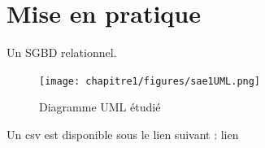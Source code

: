 \documentclass[10pt, a4paper]{article}
\begin{document}
\newpage
\section{Mise en pratique}



\begin{tcolorbox}[lefttitle=1cm, colframe=gray!75!black, colback=white, title=\textbf{ENTREE : un SGBD relationnel}]
Un SGBD relationnel.
\begin{figure}[H]
    \centering
    \texttt{[image: chapitre1/figures/sae1UML.png]}
    \caption{Diagramme UML étudié}
    \label{fig:enter-label}
\end{figure}

Un csv est disponible sous le lien suivant : lien

\end{tcolorbox}
\end{document}
